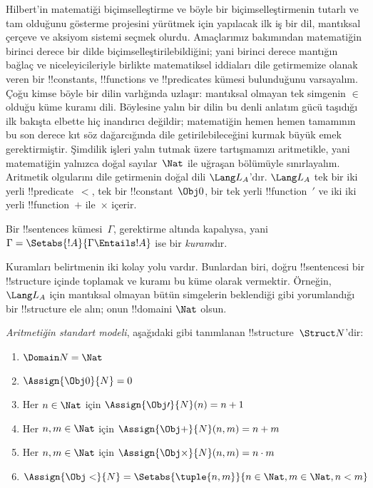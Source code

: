 \documentclass[../../../include/open-logic-section]{subfiles}
\begin{document}


Hilbert'in matematiği biçimselleştirme ve böyle bir biçimselleştirmenin
tutarlı ve tam olduğunu gösterme projesini yürütmek için yapılacak ilk iş
bir dil, mantıksal çerçeve ve aksiyom sistemi seçmek olurdu. Amaçlarımız
bakımından matematiğin birinci derece bir dilde biçimselleştirilebildiğini;
yani birinci derece mantığın bağlaç ve niceleyicileriyle birlikte matematiksel
iddiaları dile getirmemize olanak veren bir !!{constant}s,
!!{function}s ve !!{predicate}s kümesi bulunduğunu varsayalım. Çoğu
kimse böyle bir dilin varlığında uzlaşır: mantıksal olmayan tek simgenin
$\in$ olduğu küme kuramı dili. Böylesine yalın bir dilin bu denli anlatım
gücü taşıdığı ilk bakışta elbette hiç inandırıcı değildir; matematiğin hemen
hemen tamamının bu son derece kıt söz dağarcığında dile getirilebileceğini
kurmak büyük emek gerektirmiştir. Şimdilik işleri yalın tutmak üzere
tartışmamızı aritmetikle, yani matematiğin yalnızca doğal sayılar~$\Nat$ ile
uğraşan bölümüyle sınırlayalım. Aritmetik olgularını dile getirmenin doğal
dili $\Lang L_A$'dır. $\Lang L_A$ tek bir iki yerli !!{predicate}~$<$,
tek bir !!{constant}~$\Obj 0$, bir tek yerli !!{function}~$\prime$ ve iki
iki yerli !!{function}~$+$ ile~$\times$ içerir.

\begin{defn}
Bir !!{sentence}s kümesi~$\Gamma$, gerektirme altında kapalıysa, yani
$\Gamma = \Setabs{!A}{\Gamma \Entails !A}$ ise bir \emph{kuram}dır.
\end{defn}

Kuramları belirtmenin iki kolay yolu vardır. Bunlardan biri, doğru
!!{sentence}s{}i bir !!{structure} içinde toplamak ve kuramı bu küme olarak
vermektir. Örneğin, $\Lang L_A$ için mantıksal olmayan bütün simgelerin
beklendiği gibi yorumlandığı bir !!{structure} ele alın; onun !!{domain}{}i
$\Nat$ olsun.

\begin{defn}
\emph{Aritmetiğin standart modeli}, aşağıdaki gibi tanımlanan
!!{structure}~$\Struct N$'dir:
\begin{enumerate}
\item $\Domain N = \Nat$
\item $\Assign{\Obj 0}{N} = 0$
\item Her $n \in \Nat$ için $\Assign{\Obj \prime}{N}(n) = n + 1$
\item Her $n, m \in \Nat$ için $\Assign{\Obj +}{N}(n, m) = n + m$
\item Her $n, m \in \Nat$ için $\Assign{\Obj \times}{N}(n, m) = n\cdot m$
\item $\Assign{\Obj <}{N} = \Setabs{\tuple{n, m}}{n \in \Nat, m \in
  \Nat, n < m}$
\end{enumerate}
\end{defn}
\end{document}
